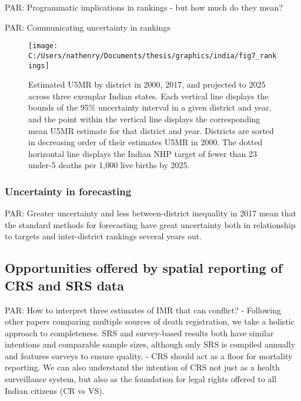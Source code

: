 \documentclass[
]{article}
\begin{document}
PAR: Programmatic implications in rankings - but how much do they mean?

PAR: Communicating uncertainty in rankings

\begin{figure}[!hbt]

{\centering \texttt{[image: C:/Users/nathenry/Documents/thesis/graphics/india/fig7\_rankings]} 

}

\caption{Estimated U5MR by district in 2000, 2017, and projected to 2025 across three exemplar Indian states. Each vertical line displays the bounds of the 95\% uncertainty interval in a given district and year, and the point within the vertical line displays the corresponding mean U5MR estimate for that district and year. Districts are sorted in decreasing order of their estimates U5MR in 2000. The dotted horizontal line displays the Indian NHP target of fewer than 23 under-5 deaths per 1,000 live births by 2025.}\label{fig:rankings}
\end{figure}

\hypertarget{uncertainty-in-forecasting}{%
\subsubsection{Uncertainty in forecasting}\label{uncertainty-in-forecasting}}

PAR: Greater uncertainty and less between-district inequality in 2017 mean that the
standard methods for forecasting have great uncertainty both in relationship to targets
and inter-district rankings several years out.

\hypertarget{opportunities-offered-by-spatial-reporting-of-crs-and-srs-data}{%
\subsection{Opportunities offered by spatial reporting of CRS and SRS data}\label{opportunities-offered-by-spatial-reporting-of-crs-and-srs-data}}

PAR: How to interpret three estimates of IMR that can conflict?
- Following other papers comparing multiple sources of death registration, we take a holistic
approach to completeness. SRS and survey-based results both have similar intentions and
comparable sample sizes, although only SRS is compiled annually and features surveys to
ensure quality.
- CRS should act as a floor for mortality reporting. We can also understand the intention
of CRS not just as a health surveillance system, but also as the foundation for legal
rights offered to all Indian citizens (CR vs VS).
\end{document}
